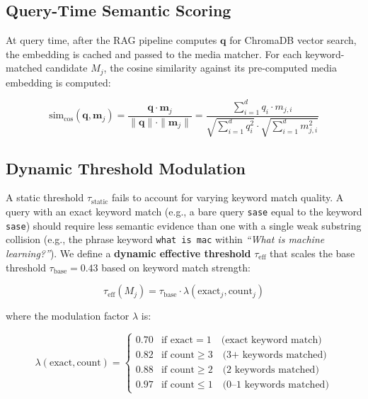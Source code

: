 \documentclass{article}
\begin{document}
\subsection{Query-Time Semantic Scoring}

At query time, after the RAG pipeline computes $\mathbf{q}$ for ChromaDB vector search, the embedding is cached and passed to the media matcher. For each keyword-matched candidate $M_j$, the cosine similarity against its pre-computed media embedding is computed:

\begin{equation}
\text{sim}_{\text{cos}}(\mathbf{q}, \mathbf{m}_j) = \frac{\mathbf{q} \cdot \mathbf{m}_j}{\|\mathbf{q}\| \cdot \|\mathbf{m}_j\|} = \frac{\sum_{i=1}^d q_i \cdot m_{j,i}}{\sqrt{\sum_{i=1}^d q_i^2} \cdot \sqrt{\sum_{i=1}^d m_{j,i}^2}}
\end{equation}

\subsection{Dynamic Threshold Modulation}

A static threshold $\tau_{\text{static}}$ fails to account for varying keyword match quality. A query with an exact keyword match (e.g., a bare query \texttt{sase} equal to the keyword \texttt{sase}) should require less semantic evidence than one with a single weak substring collision (e.g., the phrase keyword \texttt{what is mac} within \textit{``What is machine learning?''}). We define a \textbf{dynamic effective threshold} $\tau_{\text{eff}}$ that scales the base threshold $\tau_{\text{base}} = 0.43$ based on keyword match strength:

\begin{equation}
\tau_{\text{eff}}(M_j) = \tau_{\text{base}} \cdot \lambda(\text{exact}_j, \text{count}_j)
\end{equation}

where the modulation factor $\lambda$ is:

\begin{equation}
\lambda(\text{exact}, \text{count}) = \begin{cases}
0.70 & \text{if } \text{exact} = 1 \quad \text{(exact keyword match)} \\
0.82 & \text{if } \text{count} \geq 3 \quad \text{(3+ keywords matched)} \\
0.88 & \text{if } \text{count} \geq 2 \quad \text{(2 keywords matched)} \\
0.97 & \text{if } \text{count} \leq 1 \quad \text{(0--1 keywords matched)}
\end{cases}
\end{equation}
\end{document}
